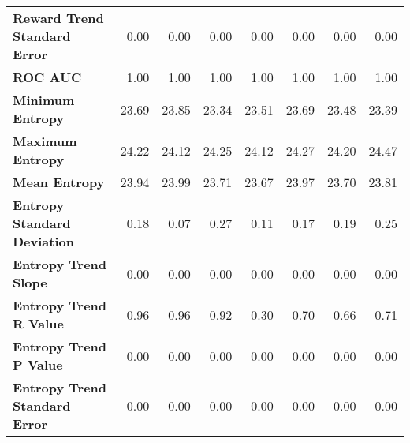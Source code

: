 \begin{tabular}{lrrrrrrr}
\textbf{Reward Trend Standard Error} & 0.00 & 0.00 & 0.00 & 0.00 & 0.00 & 0.00 & 0.00 \\
\textbf{ROC AUC} & 1.00 & 1.00 & 1.00 & 1.00 & 1.00 & 1.00 & 1.00 \\
\textbf{Minimum Entropy} & 23.69 & 23.85 & 23.34 & 23.51 & 23.69 & 23.48 & 23.39 \\
\textbf{Maximum Entropy} & 24.22 & 24.12 & 24.25 & 24.12 & 24.27 & 24.20 & 24.47 \\
\textbf{Mean Entropy} & 23.94 & 23.99 & 23.71 & 23.67 & 23.97 & 23.70 & 23.81 \\
\textbf{Entropy Standard Deviation} & 0.18 & 0.07 & 0.27 & 0.11 & 0.17 & 0.19 & 0.25 \\
\textbf{Entropy Trend Slope} & -0.00 & -0.00 & -0.00 & -0.00 & -0.00 & -0.00 & -0.00 \\
\textbf{Entropy Trend R Value} & -0.96 & -0.96 & -0.92 & -0.30 & -0.70 & -0.66 & -0.71 \\
\textbf{Entropy Trend P Value} & 0.00 & 0.00 & 0.00 & 0.00 & 0.00 & 0.00 & 0.00 \\
\textbf{Entropy Trend Standard Error} & 0.00 & 0.00 & 0.00 & 0.00 & 0.00 & 0.00 & 0.00 \\
\bottomrule
\end{tabular}

